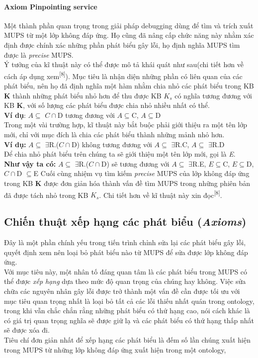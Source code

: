 \paragraph{Axiom Pinpointing service} Một thành phần quan trọng trong giải pháp debugging dùng để tìm và trích xuất MUPS từ một lớp không đáp ứng. Họ cũng đã nâng cấp chức năng này nhằm xác định được chính xác những phần phát biểu gây lỗi, họ định nghĩa  
MUPS tìm được là \textit{precise} MUPS.
\\
Ý tưởng của kĩ thuật này có thể được mô tả khái quát như sau(chi tiết hơn về cách áp dụng xem\textsuperscript{[8]}). Mục tiêu là nhận diện những phần có liên quan của các phát biểu, nên họ đã định nghĩa một hàm nhằm chia nhỏ các phát biểu trong KB \textbf{K} thành những phát biểu nhỏ hơn để thu được KB $K_{s}$ có nghĩa tương đương với KB \textbf{K}, với số lượng các phát biểu được chia nhỏ nhiều nhất có thể.
\\\textbf{Ví dụ}:	 $A\subseteq$ $C\cap$D tương đương với $A\subseteq$C, $A\subseteq$D
\\
Trong một vài trường hợp, kĩ thuật này bắt buộc phải giới thiệu ra một tên lớp mới, chỉ với mục đích là chia các phát biểu thành những mảnh nhỏ hơn.
\\\textbf{Ví dụ:}	$A\subseteq$ $\exists$R.($C\cap$D) không tương đương với $A\subseteq$ $\exists$R.C, $A\subseteq$ $\exists$R.D
\\Để chia nhỏ phát biểu trên chúng ta sẽ giới thiệu một tên lớp mới, gọi là \textit{E}.
\\\textbf{Như vậy ta có:}
$A\subseteq$ $\exists$R.($C\cap$D) sẽ tương đương với $A\subseteq$ $\exists$R.E, $E\subseteq$C, $E\subseteq$D, $C\cap$D $\subseteq$E
Cuối cùng nhiệm vụ tìm kiếm \textit{precise} MUPS của lớp không đáp ứng trong KB \textbf{K} được đơn giản hóa thành vấn đề tìm MUPS trong những phiên bản đã được tách nhỏ trong KB $K_{s}$. Chi tiết hơn về kĩ thuật này xin đọc\textsuperscript{[8]}.
\subsection{Chiến thuật xếp hạng các phát biểu (\textit{Axioms})}
Đây là một phần chính yếu trong tiến trình chỉnh sửa lại các phát biểu gây lỗi, quyết định xem nên loại bỏ phát biểu nào từ MUPS để sửa được lớp không đáp ứng.
\\
\hspace{.05\textwidth} Với mục tiêu này, một nhân tố đáng quan tâm là các phát biểu trong MUPS có thể được \textit{xếp hạng} dựa theo mức độ quan trọng của chúng hay không. Việc sửa chữa các nguyên nhân gây lỗi được trở thành một vấn đề cần được tối ưu với mục tiêu quan trọng nhất là loại bỏ tất cả các lỗi thiếu nhất quán trong ontology, trong khi vẫn chắc chắn rằng những phát biểu có thứ hạng cao, nói cách khác là có giá trị quan trọng nghĩa sẽ được giữ lạ và các phát biểu có thứ hạng thấp nhất sẽ được xóa đi.
\\
\hspace{.05\textwidth} Tiêu chí đơn giản nhất để xếp hạng các phát biểu là đếm số lần chúng xuất hiện trong MUPS từ những lớp không đáp ứng xuất hiện trong một ontology,
